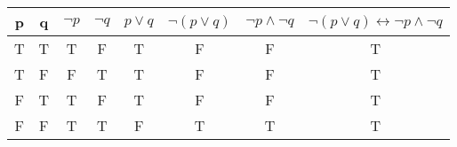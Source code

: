 \documentclass{article}
\begin{document}
\begin{center}
\begin{tabular}{ |c|c|c|c|c|c|c|c| } 
 \hline
 p & q & $\lnot p$ & $\lnot q$ & $p\lor q$ & $\lnot(p\lor q)$ & $\lnot p\land \lnot q$ & $\lnot(p\lor q)\leftrightarrow \lnot p\land \lnot q$ \\ 
 \hline
 T & T & T & F & T & F & F & T \\ 
 T & F & F & T & T & F & F & T \\
 F & T & T & F & T & F & F & T \\
 F & F & T & T & F & T & T & T \\
 \hline
\end{tabular}
\end{center}
\end{document}
